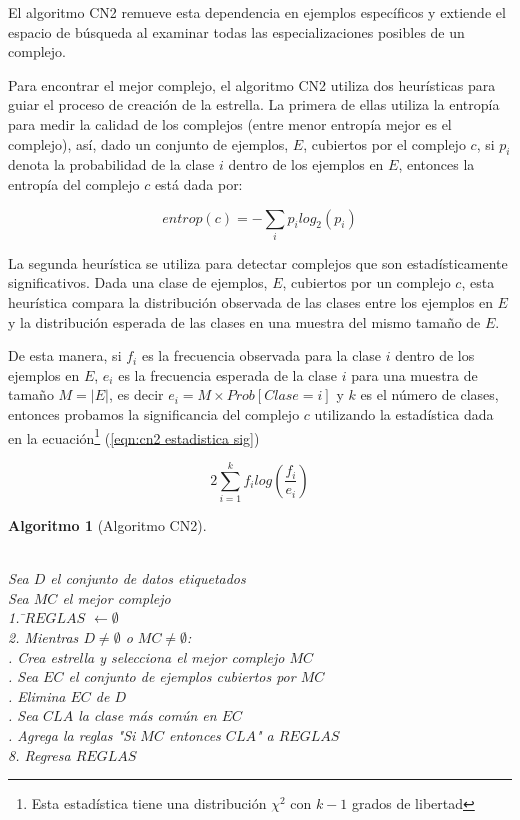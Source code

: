 \documentclass[12pt]{report}
\theoremstyle{break}
\theoremstyle{break}
\newtheorem{algoritmo}{Algoritmo}[chapter]
\begin{document}
El algoritmo CN2 remueve esta dependencia en ejemplos específicos y extiende el espacio de búsqueda al examinar todas las especializaciones posibles de un complejo.

Para encontrar el mejor complejo, el algoritmo CN2 utiliza dos heurísticas para guiar el proceso de creación de la estrella. La primera de ellas utiliza la entropía para medir la calidad de los complejos (entre menor entropía mejor es el complejo), así, dado un conjunto de ejemplos, $E$, cubiertos por el complejo $c$, si $p_i$ denota la probabilidad de la clase $i$ dentro de los ejemplos en $E$, entonces la entropía del complejo $c$ está dada por:

\begin{equation} \label{eqn:entropia complejo}
entrop(c) = - \sum_{i} p_i log_{2}(p_{i})
\end{equation}

La segunda heurística se utiliza para detectar complejos que son estadísticamente significativos. Dada una clase de ejemplos, $E$, cubiertos por un complejo $c$, esta heurística compara la distribución observada de las clases entre los ejemplos en $E$ y la distribución esperada de las clases en una muestra del mismo tamaño de $E$.

De esta manera, si $f_i$ es la frecuencia observada para la clase $i$ dentro de los ejemplos en $E$, $e_{i}$ es la frecuencia esperada de la clase $i$ para una muestra de tamaño $M=\vert E \vert$, es decir $e_i = M \times Prob\left[ Clase = i \right]$ y $k$ es el número de clases, entonces probamos la significancia del complejo $c$ utilizando la estadística dada en la ecuación\footnote{Esta estadística tiene una distribución $\chi^2$ con $k-1$ grados de libertad } (\ref{eqn:cn2 estadistica sig})

\begin{equation} \label{eqn:cn2 estadistica sig}
2 \sum_{i=1}^{k} f_{i} log\left(\frac{f_{i}} {e_{i}} \right)
\end{equation}

\begin{algoritmo}[Algoritmo CN2]
\begin{tabbing}
\\Sea $D$ el conjunto de datos etiquetados
\\Sea $MC$ el mejor complejo\\
1. \=$REGLAS$ $\leftarrow \emptyset $ \\
2. Mientras $D \neq \emptyset$ o $MC \neq \emptyset$:\\
 . Crea estrella y selecciona el mejor complejo $MC$\\
 . Sea $EC$ el conjunto de ejemplos cubiertos por $MC$ \\
 . Elimina $EC$ de $D$\\
 . Sea $CLA$ la clase más común en $EC$\\
 . Agrega la reglas "Si $MC$ entonces $CLA$" a $REGLAS$\\
8. Regresa $REGLAS$
\end{tabbing}
\label{algo:CN2}
\end{algoritmo}
\end{document}
